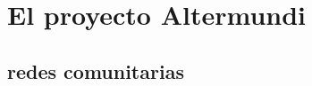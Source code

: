 \section{El proyecto Altermundi}

\subsection{redes comunitarias}

\begin{comment}
redes convencionales: organizadas de manera jerárquica (Telematik heranziehen?):
topología centralizada: el nodo en el centro tiene control/papel clave: si falla, toda la red se desmantela.

redes mesh: cada nodo está conectado con más de 1 otro: topología más perdurable/estable; todos los nodos son iguales;

redes comunitarias: son en general redes mesh con una pretención política
características:
* infraestructura de comunicación decentralizada, creada y mantenida por la comunidad de lxs usuarixs
* garantizar acceso libre a información
* garantizar la libertad de expresión
* ..
* el firmware: software libre

      \item infraestructura de comunicación abierta, accesible para tod@s
      \item infraestructura creada y mantenida por la comunidad de l@s usuari@s
      \item ejemplos:
        \begin{itemize}
          \item Freifunk (Alemania)
          \item guifi.net (España/Cataluña)
          \item ninux (Italia)
          \item Funkfeuer (Austria)
        \end{itemize}

  \begin{itemize}
    \item conectar a comunidades excluidas por los proveedores convencionales de servicios Internet
    \item garantizar acceso libre a información
    \item garantizar la libertad de expreción
    \item profundizar los propios conocimientos técnicos, experimentar
    \item educar y concienciar a más gente
  \end{itemize}

surgen de necesidades locales:
por ejemplo en el caso de Altermundi: pequeños pueblos, poblaciones en las altas cumbres; localidades donde los proveedores convencionales no ven oportunidad de lucro y por eso no prestan servicio

se ubican en el contexto del ciberoptimismo (DEF)

reflexión crítica: está la solución fiable en gran escala: vgl papel del estado (IV Gui); última milla
\end{comment}

